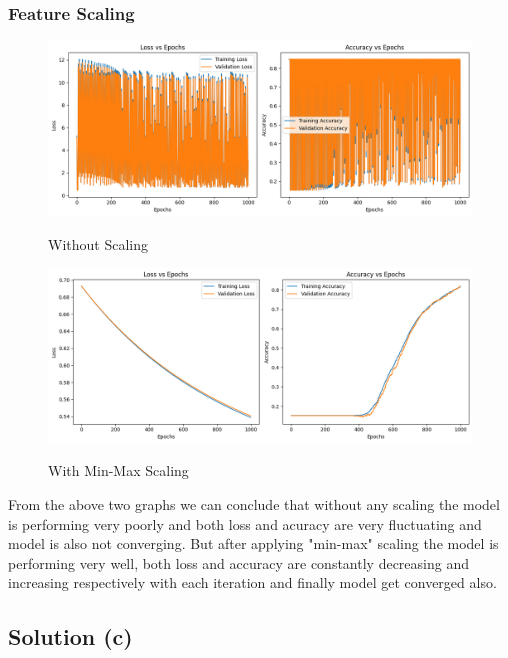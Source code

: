 \documentclass{article}
\begin{document}
\subsubsection*{Feature Scaling}
\begin{figure}[H] %
    \centering
    \begin{minipage}{0.49\linewidth}
        \centering
        \includegraphics[width=\linewidth]{assets/b-1.png}
        \caption{Without Scaling}{}
        \label{fig:b-1}
    \end{minipage}
    \hfill
    \begin{minipage}{0.49\linewidth}
        \centering
        \includegraphics[width=\linewidth]{assets/b-2.png}
        \caption{With Min-Max Scaling}{}
        \label{fig:b-2}
    \end{minipage}
\end{figure}
\hspace{-3pt}
From the above two graphs we can conclude that without any scaling the model is performing very poorly and both loss and acuracy are very fluctuating and model is also not converging. But after applying "min-max" scaling the model is performing very well, both loss and accuracy are constantly decreasing and increasing respectively with each iteration and finally model get converged also.

\vspace{30pt}
\subsection*{Solution (c)}
\end{document}
